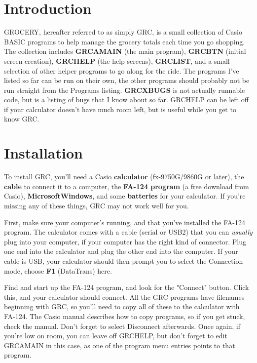 \documentclass[]{article}
\begin{document}
\maketitle
	
\section{Introduction}

GROCERY, hereafter referred to as simply GRC, is a small collection of Casio BASIC programs
to help manage the grocery totals each time you go shopping. The collection includes {\bf GRCAMAIN} 
(the main program), {\bf GRCBTN} (initial screen creation), {\bf GRCHELP} (the help screens), {\bf GRCLIST},
and a small selection of other helper programs to go along for the ride. The programs I've listed so far
can be run on their own, the other programs should probably not be run straight from the Programs listing.
{\bf GRCXBUGS } is not actually runnable code, but is a listing of bugs that I know about so far. GRCHELP can be
left off if your calculator doesn't have much room left, but is useful while you get to know GRC.


\section{Installation}

To install GRC, you'll need a Casio {\bf calculator} (fx-9750G/9860G or later), the {\bf cable} to connect
it to a computer, the {\bf FA-124 program} (a free download from Casio), {\bf Microsoft\trade Windows\trade}, and
some {\bf batteries} for your calculator. If you're missing any of these things, GRC may not work well for you.

First, make sure your computer's running, and that you've installed the FA-124 program.
The calculator comes with a cable (serial or USB2) that you can { \it usually \/} plug
into your computer, if your computer has the right kind of connector. Plug one end into
the calculator and plug the other end into the computer. If your cable is USB, your calculator
should then prompt you to select the Connection mode, choose {\bf F1} (DataTrans) here.

Find and start up the FA-124 program, and look for the "Connect" button. Click this, and
your calculator should connect.
All the GRC programs have filenames beginning with GRC, so you'll need to copy all of these to the calculator with FA-124. The Casio manual
describes how to copy programs, so if you get stuck, check the manual. Don't forget to select Disconnect afterwards. Once again, if you're low
on room, you can leave off GRCHELP, but don't forget to edit GRCAMAIN in this case, as one of the program menu entries points to that program.
\end{document}
